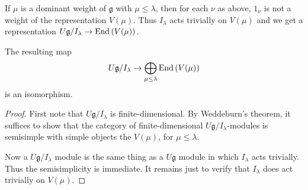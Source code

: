 \documentclass[11pt,leqno]{article}
\begin{document}
If $ \mu $ is a dominant weight of $ \mathfrak g $ with $ \mu \le \lambda $, then for each $ \nu $ as above, $ 1_\nu $ is not a weight of the representation $ V(\mu)$.  Thus $ I_\lambda $ acts trivially on $ V(\mu) $ and we get a representation $ U \mathfrak g / I_\lambda \rightarrow \operatorname{End}\left(V(\mu)\right) $.

\begin{lem}
The resulting map
$$
U \mathfrak g / I_\lambda \rightarrow \bigoplus_{\mu \le \lambda} \operatorname{End}\left( V(\mu)\right)
$$
is an isomorphism.
\end{lem}

\begin{proof}
First note that $U \mathfrak g/ I_\lambda $ is finite-dimensional.  By Weddeburn's theorem, it suffices to show that the category of finite-dimensional $ U\mathfrak g / I_\lambda $-modules is semisimple with simple objects the $ V(\mu) $, for $ \mu \le \lambda $.

Now a $ U\mathfrak g / I_\lambda$ module is the same thing as a $ U\mathfrak g $ module in which $ I_\lambda $ acts trivially.  Thus the semisimplicity is immediate.  It remains just to verify that $ I_\lambda $ does act trivially on $ V(\mu)$.

\end{proof}
\end{document}

